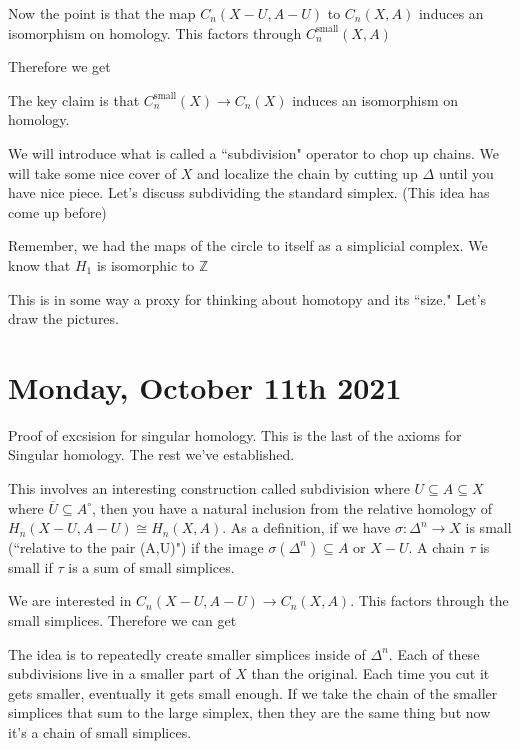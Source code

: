 \documentclass[12pt]{article}
\theoremstyle{definition}
\begin{document}
	Now the point is that the map $C_n(X-U,A-U)$ to $C_n(X,A)$ induces an isomorphism on homology. This factors through $C_n^{\text{small}}(X,A)$
	
	Therefore we get \begin{center}
	\end{center}
	The key claim is that $C_n^{\text{small}}(X)\to C_n(X)$ induces an isomorphism on homology.
	
	We will introduce what is called a ``subdivision" operator to chop up chains. We will take some nice cover of $X$ and localize the chain by cutting up $\Delta$ until you have nice piece. Let's discuss subdividing the standard simplex. (This idea has come up before)
	
	
	Remember, we had the maps of the circle to itself as a simplicial complex. We know that $H_1$ is isomorphic to $\mathbb{Z}$
	
	This is in some way a proxy for thinking about homotopy and its ``size." Let's draw the pictures. 
	
	\section{Monday, October 11th 2021}
	Proof of excsision for singular homology. This is the last of the axioms for Singular homology. The rest we've established.
	
	This involves an interesting construction called subdivision where $U\subseteq A\subseteq X$ where $\overline{U}\subseteq A^\circ$, then you have a natural inclusion from the relative homology of $H_n(X-U, A-U)\cong H_n(X,A)$. As a definition, if we have $\sigma:\Delta^n\to X$ is small (``relative to the pair (A,U)") if the image $\sigma(\Delta^n)\subseteq A$ or $X-U$. A chain $\tau$ is small if $\tau$ is a sum of small simplices. 
	
	We are interested in $C_n(X-U,A-U)\to C_n(X,A)$. This factors through the small simplices. Therefore we can get\begin{center}
	\end{center}
	The idea is to repeatedly create smaller simplices inside of $\Delta^n$. Each of these subdivisions live in a smaller part of $X$ than the original. Each time you cut it gets smaller, eventually it gets small enough. If we take the chain of the smaller simplices that sum to the large simplex, then they are the same thing but now it's a chain of small simplices. 
	
\end{document}

